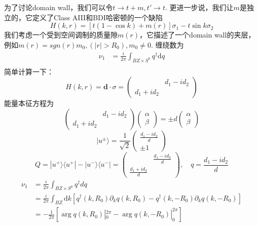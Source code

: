 \documentclass{article}
\numberwithin{equation}{subsection}
\begin{document}
为了讨论domain wall，我们可以令$t\rightarrow t+m,t'\rightarrow t$. 更进一步说，我们让$m$是独立的，它定义了Class AIII和BDI哈密顿的一个缺陷
\begin{equation}
    H(k,r)=[t(1-\cos k)+m(r)]\sigma_1-t\sin k\sigma_2
\end{equation}
我们考虑一个受到空间调制的质量隙$m(r)$，它描述了一个domain wall的夹层，例如$m(r)=sgn(r)m_0,(|r|>R_0),m_0\neq 0$. 缠绕数为
\begin{equation}
    \begin{split}
        \nu_1&=\frac{i}{2\pi}\int_{BZ\times S^0}q^\dagger\mathrm{d}q\\
    \end{split}
\end{equation}
简单计算一下：
\begin{equation}
    H(k,r)=\mathbf{d}\cdot \sigma=\begin{pmatrix}
        &d_1-id_2\\
        d_1+id_2&
    \end{pmatrix}
\end{equation}
能量本征方程为
\begin{equation}
    \begin{pmatrix}
        &d_1-id_2\\
        d_1+id_2&
    \end{pmatrix}\begin{pmatrix}
        \alpha\\
        \beta
    \end{pmatrix}=\pm d\begin{pmatrix}
        \alpha\\
        \beta
    \end{pmatrix}
\end{equation}
\begin{equation}
    |u^\pm\rangle=\frac{1}{\sqrt{2}}\begin{pmatrix}
        \frac{d_1-id_2}{d}\\
        \pm 1
    \end{pmatrix}
\end{equation}
\begin{equation}
    Q=|u^+\rangle\langle u^+|-|u^-\rangle\langle u^-|=\begin{pmatrix}
        &\frac{d_1-id_2}{d}\\
        \frac{d_1+id_2}{d}&
    \end{pmatrix},\quad q=\frac{d_1-id_2}{d}
\end{equation}
\begin{equation}
    \begin{split}
        \nu_1&=\frac{i}{2\pi}\int_{BZ\times S^0}q^\dagger dq\\
        &=\frac{i}{2\pi}\int_{BZ}\mathrm{d}k[q^\dagger(k,R_0)\partial_k q(k,R_0)-q^\dagger(k,-R_0)\partial_k q(k,-R_0)]\\
        &=-\frac{1}{2\pi}[\arg q(k,R_0)|_0^{2\pi}-\arg q(k,-R_0)|_0^{2\pi}]
    \end{split}
\end{equation}
\end{document}
